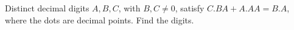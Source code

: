 Distinct decimal digits $A,B,C$, with $B,C\ne0$, satisfy $C.BA+A.AA=B.A$, where the dots are decimal points. Find the digits.
